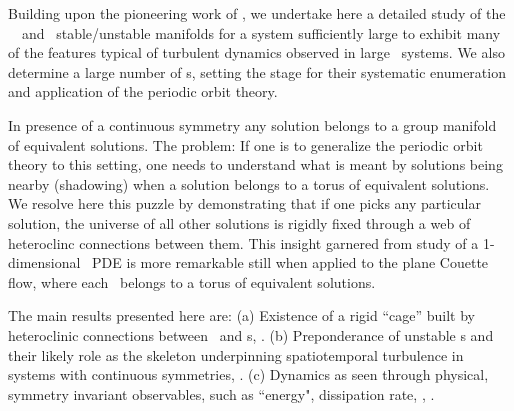 Building upon the pioneering work of
, we undertake here a detailed study of the 
\KS\ \eqva\ and \reqva\ stable/unstable manifolds
for a system sufficiently large to exhibit many of
the features typical of turbulent dynamics observed in large \KS\ systems.
We also determine a large number of \rpo s, setting the
stage for their systematic enumeration and application 
of the periodic orbit theory.

In presence of a continuous symmetry any solution belongs to a 
group manifold of equivalent solutions. The problem: If one is to generalize
the periodic orbit theory to this setting, one needs to understand what
is meant by solutions being nearby (shadowing) when a solution 
belongs to
a torus of equivalent solutions. 
We resolve here this puzzle by demonstrating that if one picks
any particular solution, the universe of all other solutions is
rigidly fixed through a web of heteroclinc connections between them.
This insight garnered from study of a
1-dimensional \KS\ PDE is more remarkable still when applied to
the plane Couette flow, where each \eqv\ belongs
to a torus of equivalent solutions.


The main results presented here are:
(a) Existence of a rigid ``cage'' built by heteroclinic connections
between \eqva\ and \po s,
. 
(b) Preponderance of unstable \rpo s and their likely
role as the skeleton underpinning spatiotemporal turbulence in
systems with continuous symmetries, 
. 
(c) Dynamics as seen 
through physical, symmetry invariant observables, such as
``energy", dissipation rate, \etc,
.



